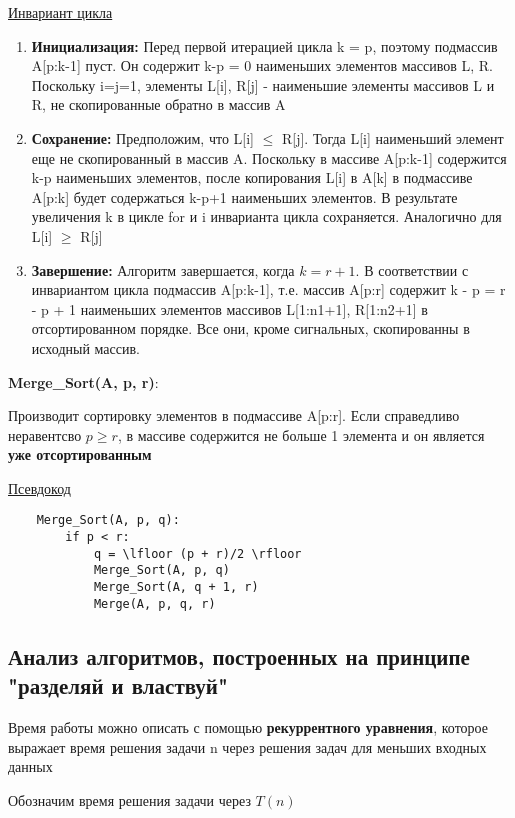 \documentclass[a4paper, 12pt]{article}
\begin{document}
\begin{enumerate}
\underline{Инвариант цикла}

\begin{enumerate}
    \item \textbf{Инициализация:} Перед первой итерацией цикла k = p, поэтому подмассив A[p:k-1] пуст.
    Он содержит k-p = 0 наименьших элементов массивов L, R. Поскольку i=j=1, элементы L[i], R[j] -
    наименьшие элементы массивов L и R, не скопированные обратно в массив A
    \item \textbf{Сохранение:} Предположим, что L[i] $\leq$ R[j]. Тогда L[i] наименьший элемент еще
    не скопированный в массив A. Поскольку в массиве A[p:k-1] содержится k-p наименьших элементов,
    после копирования L[i] в A[k] в подмассиве A[p:k] будет содержаться k-p+1 наименьших элементов.
    В результате увеличения k в цикле for и i инварианта цикла сохраняется. Аналогично для L[i] $\geq$ R[j]
    \item \textbf{Завершение:} Алгоритм завершается, когда $k = r + 1$. 
    В соответствии с инвариантом цикла подмассив A[p:k-1], т.е. массив A[p:r] содержит k - p = r - p + 1 наименьших элементов
    массивов L[1:n1+1], R[1:n2+1] в отсортированном порядке. Все они, кроме сигнальных, скопированны в исходный массив.
\end{enumerate}

\textbf{Merge_Sort(A, p, r)}:

Производит сортировку элементов в подмассиве A[p:r]. Если справедливо неравентсво $p \geq r$,
в массиве содержится не больше 1 элемента и он является \textbf{уже отсортированным}

\underline{Псевдокод}

\begin{lstlisting}
    Merge_Sort(A, p, q):
        if p < r:
            q = \lfloor (p + r)/2 \rfloor
            Merge_Sort(A, p, q)
            Merge_Sort(A, q + 1, r)
            Merge(A, p, q, r)
\end{lstlisting}

\subsection{Анализ алгоритмов, построенных на принципе "разделяй и властвуй"}

Время работы можно описать с помощью \textbf{рекуррентного уравнения},
которое выражает время решения задачи n через решения задач для меньших входных данных

Обозначим время решения задачи через $T(n)$


\end{enumerate}
\end{document}
